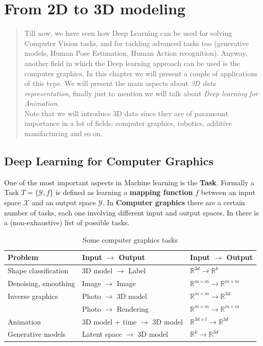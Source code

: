 \chapter{From 2D to 3D modeling}

\begin{quotation}
    \noindent
    \textsf{Till now, we have seen how Deep Learning can be used for solving Computer Vision tasks, and for tackling advanced tasks too (generative models, Human Pose Estimation, Human Action recognition). Anyway, another field in which the Deep learning approach can be used is the \textsf{computer graphics}. In this chapter we will present a couple of applications of this type. We will present the main aspects about \textit{3D data representation}, finally just to mention we will talk about \textit{Deep learning for Animation}. \\
    Note that we will introduce 3D data since they are of paramount importance in a lot of fields: computer graphics, robotics, additive manifacturing and so on.
    }
\end{quotation}

\section{Deep Learning for Computer Graphics}
One of the most important aspects in Machine learning is the \textbf{Task}. Formally a Task $T=\{\mathcal{Y},f\}$ is defined as learning a \textbf{mapping function} $f$ between an input space $\mathcal{X}$ and an output space $\mathcal{Y}$. In \textbf{Computer graphics} there are a certain number of tasks, each one involving different input and output spaces. In  there is a (non-exhaustive) list of possible tasks. 

\begin{table}[h!]
    \centering
    \begin{tabular}{|l|l|l|}
    \hline
    \textbf{Problem} & \textbf{Input $\to$ Output} & \textbf{Input $\to$ Output} \\ \hline
    Shape classification & 3D model $\to$ Label & $\mathbb{R}^{3d} \to \mathbb{R}^k$ \\ \hline
    Denoising, smoothing & Image $\to$ Image & $\mathbb{R}^{m \times m} \to \mathbb{R}^{m \times m}$ \\ \hline
    Inverse graphics & Photo $\to$ 3D model & $\mathbb{R}^{m \times m} \to \mathbb{R}^{3d}$ \\
    &Photo $\to$ Rendering &  $\mathbb{R}^{m \times m} \to \mathbb{R}^{m \times m}$ \\ \hline
    Animation & 3D model + time $\to$ 3D model & $\mathbb{R}^{3d \times t} \to \mathbb{R}^{3d}$ \\ \hline
    Generative models & Latent space $\to$ 3D model & $\mathbb{R}^k \to \mathbb{R}^{3d}$ \\ \hline
    \end{tabular}
    \caption{Some computer graphics tasks}
    \label{tab:problems}
\end{table}

